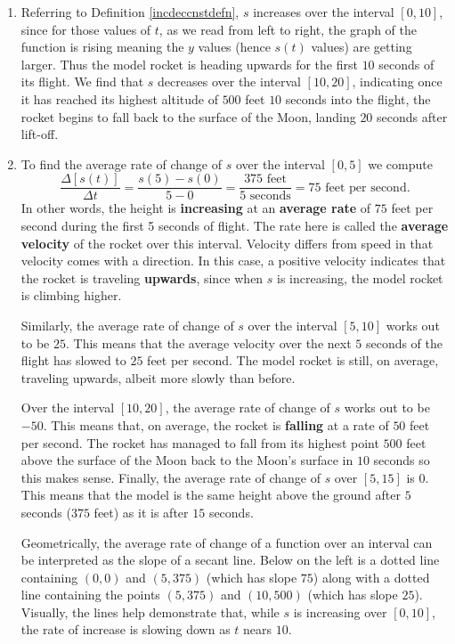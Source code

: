 \documentclass{ximera}
\begin{document}
\begin{example}
\begin{enumerate}
\item  Referring to Definition \ref{incdeccnstdefn}, $s$ increases over the interval $[0, 10]$, since for those values of $t$, as we read from left to right, the graph of the function is rising meaning the $y$ values (hence $s(t)$ values) are getting larger. Thus the model rocket is heading upwards for the first $10$ seconds of its flight.  We find that $s$ decreases over the interval $[10, 20]$, indicating once it has reached its highest altitude of $500$ feet $10$ seconds into the flight, the rocket begins to fall back to the surface of the Moon, landing $20$ seconds after lift-off.

\item  To find the average rate of change of $s$ over the interval $[0, 5]$ we compute \[ \dfrac{\Delta[s(t)]}{\Delta t} = \dfrac{s(5) - s(0)}{5 - 0} = \dfrac{\text{$375$ feet}}{\text{$5$ seconds}} = \text{$75$ feet per second}.\] In other words, the height is \textbf{increasing} at an \textbf{average rate} of $75$ feet per second during the first 5 seconds of flight.  The rate here is called the  \textbf{average velocity} of the rocket over this interval.  Velocity differs from speed in that velocity comes with a direction.  In this case, a positive velocity indicates that the rocket is traveling \textbf{upwards}, since when $s$ is increasing, the model rocket is climbing higher.  



Similarly, the average rate of change of $s$ over the interval $[5, 10]$ works out to be $25$.  This means that the average velocity over the next $5$ seconds of the flight has slowed to $25$ feet per second. The model rocket is still, on average, traveling upwards, albeit more slowly than before.  



Over the interval $[10, 20]$, the average rate of change of $s$ works out to be $-50$.  This means that, on average, the rocket is \textbf{falling} at a rate of $50$ feet per second.  The rocket has managed to fall from its highest point $500$ feet above the surface of the Moon back to the Moon's surface in $10$ seconds so this makes sense. Finally, the average rate of change of $s$ over $[5, 15]$ is $0$.  This means that the model is the same height above the ground after $5$ seconds ($375$ feet) as it is after $15$ seconds.    



Geometrically, the average rate of change of a function over an interval can be interpreted as the slope of a secant line. Below on the left is a dotted line containing $(0, 0)$ and $(5, 375)$ (which has slope $75$) along with a dotted line containing the points $(5, 375)$ and $(10, 500)$ (which has slope $25$).  Visually, the lines help demonstrate that, while $s$ is increasing over $[0, 10]$, the rate of increase is slowing down as $t$ nears $10$.  




\end{enumerate}
\end{example}
\end{document}
